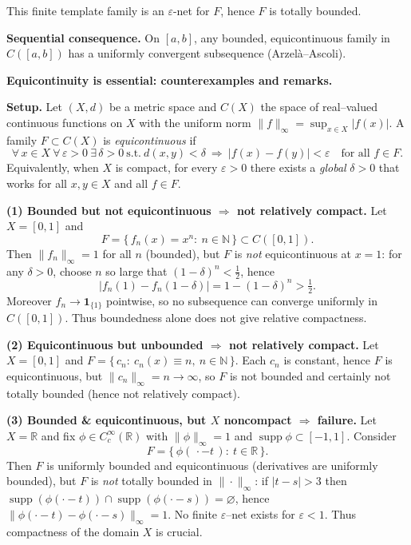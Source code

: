 \documentclass[12pt,a4paper]{article}
\begin{document}
	This finite template family is an $\varepsilon$-net for $F$, hence $F$ is totally bounded.
	
	\medskip
	\textbf{Sequential consequence.}
	On $[a,b]$, any bounded, equicontinuous family in $C([a,b])$ has a uniformly convergent subsequence (Arzel\`a–Ascoli).
	
	
	\textbf{Equicontinuity is essential: counterexamples and remarks.}
	
	\medskip
	\textbf{Setup.}
	Let $(X,d)$ be a metric space and $C(X)$ the space of real--valued continuous
	functions on $X$ with the uniform norm $\|f\|_\infty=\sup_{x\in X}|f(x)|$.
	A family $F\subset C(X)$ is \emph{equicontinuous} if
	\[
	\forall\,x\in X\ \forall\,\varepsilon>0\ \exists\,\delta>0\ \text{s.t.}\ 
	d(x,y)<\delta\ \Longrightarrow\ |f(x)-f(y)|<\varepsilon\quad \text{for all } f\in F.
	\]
	Equivalently, when $X$ is compact, for every $\varepsilon>0$ there exists a \emph{global}
	$\delta>0$ that works for all $x,y\in X$ and all $f\in F$.
	
	\medskip
	\textbf{(1) Bounded but not equicontinuous $\Rightarrow$ not relatively compact.}
	Let $X=[0,1]$ and
	\[
	F=\{\,f_n(x)=x^n:\ n\in\mathbb N\,\}\subset C([0,1]).
	\]
	Then $\|f_n\|_\infty=1$ for all $n$ (bounded), but $F$ is \emph{not} equicontinuous at $x=1$:
	for any $\delta>0$, choose $n$ so large that $(1-\delta)^n<\tfrac12$, hence
	\[
	|f_n(1)-f_n(1-\delta)|=1-(1-\delta)^n>\tfrac12.
	\]
	Moreover $f_n\to \mathbf 1_{\{1\}}$ pointwise, so no subsequence can converge uniformly in $C([0,1])$.
	Thus boundedness alone does not give relative compactness.
	
	\medskip
	\textbf{(2) Equicontinuous but unbounded $\Rightarrow$ not relatively compact.}
	Let $X=[0,1]$ and $F=\{\,c_n:\ c_n(x)\equiv n,\ n\in\mathbb N\,\}$.
	Each $c_n$ is constant, hence $F$ is equicontinuous, but $\|c_n\|_\infty=n\to\infty$,
	so $F$ is not bounded and certainly not totally bounded (hence not relatively compact).
	
	\medskip
	\textbf{(3) Bounded \& equicontinuous, but $X$ noncompact $\Rightarrow$ failure.}
	Let $X=\mathbb R$ and fix $\phi\in C_c^\infty(\mathbb R)$ with $\|\phi\|_\infty=1$ and
	$\operatorname{supp}\phi\subset[-1,1]$. Consider
	\[
	F=\{\,\phi(\,\cdot - t\,):\ t\in\mathbb R\,\}.
	\]
	Then $F$ is uniformly bounded and equicontinuous (derivatives are uniformly bounded),
	but $F$ is \emph{not} totally bounded in $\|\cdot\|_\infty$:
	if $|t-s|>3$ then $\operatorname{supp}(\phi(\cdot-t))\cap\operatorname{supp}(\phi(\cdot-s))=\varnothing$,
	hence $\|\phi(\cdot-t)-\phi(\cdot-s)\|_\infty=1$. No finite $\varepsilon$--net exists for $\varepsilon<1$.
	Thus compactness of the domain $X$ is crucial.
	
\end{document}
